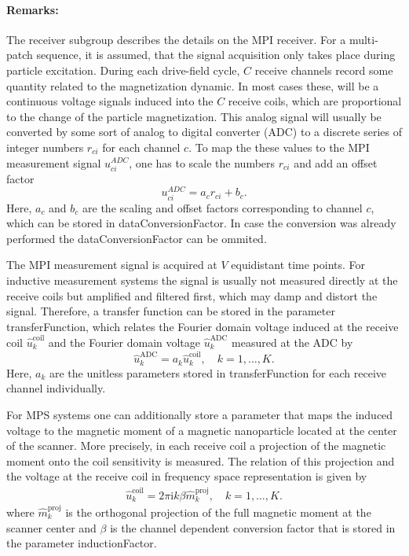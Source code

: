\documentclass[landscape,a4paper]{article} %
\newcommand{\inlvar}[1]{{\ttfamily#1}}
\begin{document}
\begin{multicols}{2}
	\paragraph{Remarks:} The receiver subgroup describes the details on the MPI receiver. For a multi-patch sequence, it is assumed, that the signal acquisition only takes place during particle excitation. During each drive-field cycle, $C$ receive channels record some quantity related to the magnetization dynamic. In most cases these, will be a continuous voltage signals induced into the $C$ receive coils, which are proportional to the change of the particle magnetization. This analog signal will usually be converted by some sort of analog to digital converter (ADC) to a discrete series of integer numbers $r_{ci}$ for each channel $c$. To map the these values to the MPI measurement signal $u_{ci}^{ADC}$, one has to scale the numbers $r_{ci}$ and add an offset factor
\begin{equation*}
	u_{ci}^{ADC} = a_c r_{ci} +b_c.
\end{equation*}
Here, $a_c$ and $b_c$ are the scaling and offset factors corresponding to channel $c$, which can be stored in \inlvar{dataConversionFactor}. In case the conversion was already performed the \inlvar{dataConversionFactor} can be ommited.

The MPI measurement signal is acquired at $V$ equidistant time points. For inductive measurement systems the signal is usually not measured directly at the receive coils but amplified and filtered first, which may damp and distort the signal. Therefore, a transfer function can be stored in the parameter \inlvar{transferFunction}, which relates the Fourier domain voltage induced at the receive coil $\hat{u}_k^\text{coil}$ and the Fourier domain voltage $\hat{u}_k^\text{ADC}$ measured at the ADC by
\begin{equation*}
\hat{u}_k^\text{ADC} = a_k  \hat{u}_k^\text{coil}, \quad k=1,\dots,K.
\end{equation*}
Here, $a_k$ are the unitless parameters stored in \inlvar{transferFunction} for each receive channel individually. 

For MPS systems one can additionally store a parameter that maps the induced voltage to the magnetic moment of a magnetic nanoparticle located at the center of the scanner. More precisely, in each receive coil a projection of the magnetic moment onto the coil sensitivity is measured. The relation of this projection and the voltage at the receive coil in frequency space representation is given by
\begin{align*}
\hat{u}_k^\text{coil} = 2\pi \textrm{i} k \beta \hat{m}_k^\text{proj} , \quad k=1,\dots,K.
\end{align*}
where $\hat{m}_k^\text{proj}$ is the orthogonal projection of the full magnetic moment at the scanner center and $\beta$ is the channel dependent conversion factor that is stored in the parameter  \inlvar{inductionFactor}.
\end{multicols}
\end{document}
